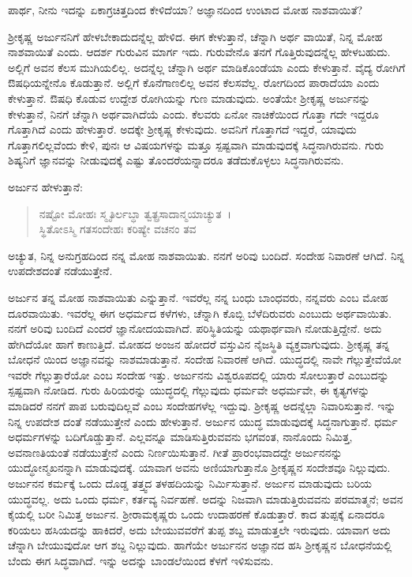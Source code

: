 {\small ಪಾರ್ಥ, ನೀನು ಇದನ್ನು ಏಕಾಗ್ರಚಿತ್ತದಿಂದ ಕೇಳಿದೆಯಾ? ಅಜ್ಞಾನದಿಂದ ಉಂಟಾದ ಮೋಹ ನಾಶವಾಯಿತೆ?}

ಶ‍್ರೀಕೃಷ್ಣ ಅರ್ಜುನನಿಗೆ ಹೇಳಬೇಕಾದುದನ್ನೆಲ್ಲ ಹೇಳಿದ. ಈಗ ಕೇಳುತ್ತಾನೆ, ಚೆನ್ನಾಗಿ ಅರ್ಥ ವಾಯಿತೆ, ನಿನ್ನ ಮೋಹ ನಾಶವಾಯಿತೆ ಎಂದು. ಆದರ್ಶ ಗುರುವಿನ ಮಾರ್ಗ ಇದು. ಗುರುವೇನೊ ತನಗೆ ಗೊತ್ತಿರುವುದನ್ನೆಲ್ಲ ಹೇಳಬಹುದು. ಅಲ್ಲಿಗೆ ಅವನ ಕೆಲಸ ಮುಗಿಯಲಿಲ್ಲ. ಅದನ್ನೆಲ್ಲ ಚೆನ್ನಾಗಿ ಅರ್ಥ ಮಾಡಿಕೊಂಡೆಯಾ ಎಂದು ಕೇಳುತ್ತಾನೆ. ವೈದ್ಯ ರೋಗಿಗೆ ಔಷಧಿಯನ್ನೇನೊ ಕೊಡುತ್ತಾನೆ. ಅಲ್ಲಿಗೆ ಕೊನೆಗಾಣಲಿಲ್ಲ ಅವನ ಕೆಲಸವೆಲ್ಲ. ರೋಗದಿಂದ ಪಾರಾದೆಯಾ ಎಂದು ಕೇಳುತ್ತಾನೆ. ಔಷಧಿ ಕೊಡುವ ಉದ್ದೇಶ ರೋಗಿಯನ್ನು ಗುಣ ಮಾಡುವುದು. ಅಂತೆಯೇ ಶ‍್ರೀಕೃಷ್ಣ ಅರ್ಜುನನ್ನು ಕೇಳುತ್ತಾನೆ, ನಿನಗೆ ಚೆನ್ನಾಗಿ ಅರ್ಥವಾಗಿದೆಯೆ ಎಂದು. ಕೆಲವರು ಏನೋ ನಾಚಿಕೆಯಿಂದ ಗೊತ್ತಾ ಗದೇ ಇದ್ದರೂ ಗೊತ್ತಾಗಿದೆ ಎಂದು ಹೇಳುತ್ತಾರೆ. ಅದಕ್ಕೇ ಶ‍್ರೀಕೃಷ್ಣ ಕೇಳುವುದು. ಅವನಿಗೆ ಗೊತ್ತಾಗದೆ ಇದ್ದರೆ, ಯಾವುದು ಗೊತ್ತಾಗಲಿಲ್ಲವೆಂದು ಕೇಳಿ, ಪುನಃ ಆ ವಿಷಯಗಳನ್ನು ಮತ್ತೂ ಸ್ಪಷ್ಟವಾಗಿ ಮಾಡುವುದಕ್ಕೆ ಸಿದ್ಧನಾಗಿರುವನು. ಗುರು ಶಿಷ್ಯನಿಗೆ ಜ್ಞಾನವನ್ನು ನೀಡುವುದಕ್ಕೆ ಎಷ್ಟು ತೊಂದರೆಯನ್ನಾದರೂ ತಡೆದುಕೊಳ್ಳಲು ಸಿದ್ಧನಾಗಿರುವನು.

ಅರ್ಜುನ ಹೇಳುತ್ತಾನೆ:

\begin{verse}
ನಷ್ಟೋ ಮೋಹಃ ಸ್ಮೃತಿರ್ಲಬ್ಧಾ ತ್ವತ್ಪ್ರಸಾದಾನ್ಮಯಾಚ್ಯುತ~।\\ಸ್ಥಿತೋಽಸ್ಮಿ ಗತಸಂದೇಹಃ ಕರಿಷ್ಯೇ ವಚನಂ ತವ 
\end{verse}

{\small ಅಚ್ಯುತ, ನಿನ್ನ ಅನುಗ್ರಹದಿಂದ ನನ್ನ ಮೋಹ ನಾಶವಾಯಿತು. ನನಗೆ ಅರಿವು ಬಂದಿದೆ. ಸಂದೇಹ ನಿವಾರಣೆ ಆಗಿದೆ. ನಿನ್ನ ಉಪದೇಶದಂತೆ ನಡೆಯುತ್ತೇನೆ.}

ಅರ್ಜುನ ತನ್ನ ಮೋಹ ನಾಶವಾಯಿತು ಎನ್ನುತ್ತಾನೆ. ಇವರೆಲ್ಲ ನನ್ನ ಬಂಧು ಬಾಂಧವರು, ನನ್ನವರು ಎಂಬ ಮೋಹ ದೂರವಾಯಿತು. ಇವರೆಲ್ಲ ಈಗ ಅಧರ್ಮದ ಕಳೆಗಳು, ಚೆನ್ನಾಗಿ ಕೊಬ್ಬಿ ಬೆಳೆದಿರುವರು ಎಂಬುದು ಅರ್ಥವಾಯಿತು. ನನಗೆ ಅರಿವು ಬಂದಿದೆ ಎಂದರೆ ಜ್ಞಾನೋದಯವಾಗಿದೆ. ಪರಿಸ್ಥಿತಿಯನ್ನು ಯಥಾರ್ಥವಾಗಿ ನೋಡುತ್ತಿದ್ದೇನೆ. ಅದು ಹೇಗಿದೆಯೋ ಹಾಗೆ ಕಾಣುತ್ತಿದೆ. ಮೋಹದ ಅಂಜನ ಹೋದರೆ ವಸ್ತುವಿನ ನೈಜಸ್ಥಿತಿ ವ್ಯಕ್ತವಾಗುವುದು. ಶ‍್ರೀಕೃಷ್ಣ ತನ್ನ ಬೋಧನೆ ಯಿಂದ ಅಜ್ಞಾನವನ್ನು ನಾಶಮಾಡುತ್ತಾನೆ. ಸಂದೇಹ ನಿವಾರಣೆ ಆಗಿದೆ. ಯುದ್ಧದಲ್ಲಿ ನಾವೇ ಗೆಲ್ಲುತ್ತೇವೆಯೋ ಇವರೇ ಗೆಲ್ಲುತ್ತಾರೆಯೋ ಎಂಬ ಸಂದೇಹ ಇತ್ತು. ಅರ್ಜುನನು ವಿಶ್ವರೂಪದಲ್ಲಿ ಯಾರು ಸೋಲುತ್ತಾರೆ ಎಂಬುದನ್ನು ಸ್ಪಷ್ಟವಾಗಿ ನೋಡಿದ. ಗುರು ಹಿರಿಯರನ್ನು ಯುದ್ಧದಲ್ಲಿ ಗೆಲ್ಲುವುದು ಧರ್ಮವೇ ಅಧರ್ಮವೇ, ಈ ಕೃತ್ಯಗಳನ್ನು ಮಾಡಿದರೆ ನನಗೆ ಪಾಪ ಬರುವುದಿಲ್ಲವೆ ಎಂಬ ಸಂದೇಹಗಳೆಲ್ಲ ಇದ್ದುವು. ಶ‍್ರೀಕೃಷ್ಣ ಅದನ್ನೆಲ್ಲಾ ನಿವಾರಿಸುತ್ತಾನೆ. ಇನ್ನು ನಿನ್ನ ಉಪದೇಶ ದಂತೆ ನಡೆಯುತ್ತೇನೆ ಎಂದು ಹೇಳುತ್ತಾನೆ. ಅರ್ಜುನ ಯುದ್ಧ ಮಾಡುವುದಕ್ಕೆ ಸಿದ್ಧನಾಗುತ್ತಾನೆ. ಧರ್ಮ ಅಧರ್ಮಗಳನ್ನು ಬದಿಗೊಡ್ಡುತ್ತಾನೆ. ಎಲ್ಲವನ್ನೂ ಮಾಡಿಸುತ್ತಿರುವವನು ಭಗವಂತ, ನಾನೊಂದು ನಿಮಿತ್ತ, ಅವನಾಣತಿಯಂತೆ ನಡೆಯುತ್ತೇನೆ ಎಂದು ನಿರ್ಣಯಿಸುತ್ತಾನೆ. ಗೀತೆ ಪ್ರಾರಂಭವಾದದ್ದೇ ಅರ್ಜುನನನ್ನು ಯುದ್ಧೋನ್ಮಖನನ್ನಾಗಿ ಮಾಡುವುದಕ್ಕೆ. ಯಾವಾಗ ಅವನು ಅಣಿಯಾಗುತ್ತಾನೊ ಶ‍್ರೀಕೃಷ್ಣನ ಸಂದೇಶವೂ ನಿಲ್ಲುವುದು. ಅರ್ಜುನನ ಕರ್ಮಕ್ಕೆ ಒಂದು ದೊಡ್ಡ ತತ್ತ್ವದ ತಳಹದಿಯನ್ನು ನಿರ್ಮಿಸುತ್ತಾನೆ. ಅರ್ಜುನ ಮಾಡುವುದು ಬರಿಯ ಯುದ್ಧವಲ್ಲ. ಅದು ಒಂದು ಧರ್ಮ, ಕರ್ತವ್ಯ ನಿರ್ವಹಣೆ. ಅದನ್ನು ನಿಜವಾಗಿ ಮಾಡುತ್ತಿರುವವನು ಪರಮಾತ್ಮನೆ; ಅವನ ಕೈಯಲ್ಲಿ ಬರೀ ನಿಮಿತ್ತ ಅರ್ಜುನ. ಶ‍್ರೀರಾಮಕೃಷ್ಣರು ಒಂದು ಉದಾಹರಣೆ ಕೊಡುತ್ತಾರೆ. ಕಾದ ತುಪ್ಪಕ್ಕೆ ಏನಾದರೂ ಕರಿಯಲು ಹಸಿಯದನ್ನು ಹಾಕಿದರೆ, ಅದು ಬೇಯುವವರೆಗೆ ತುಪ್ಪ ಶಬ್ದ ಮಾಡುತ್ತಲೇ ಇರುವುದು. ಯಾವಾಗ ಅದು ಚೆನ್ನಾಗಿ ಬೇಯುವುದೋ ಆಗ ಶಬ್ದ ನಿಲ್ಲುವುದು. ಹಾಗೆಯೇ ಅರ್ಜುನನ ಅಜ್ಞಾನದ ಹಸಿ ಶ‍್ರೀಕೃಷ್ಣನ ಬೋಧನೆಯಲ್ಲಿ ಬೆಂದು ಈಗ ಸಿದ್ಧವಾಗಿದೆ. ಇನ್ನು ಅದನ್ನು ಬಾಂಡಲೆಯಿಂದ ಕೆಳಗೆ ಇಳಿಸುವನು.

